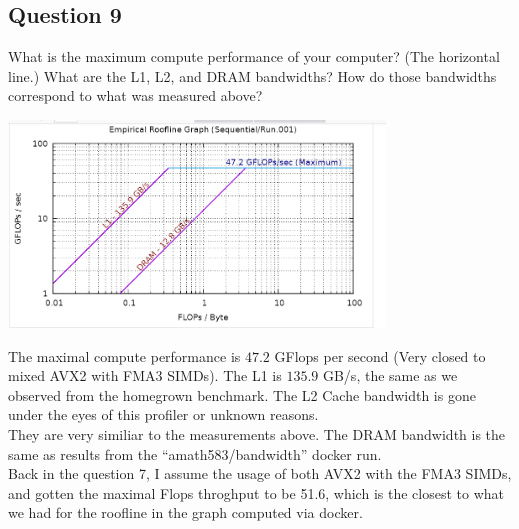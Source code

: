 \documentclass[]{article}
\begin{document}
\subsection*{Question 9}
    What is the maximum compute performance of your computer?  (The horizontal line.)  What are the L1, L2, and DRAM bandwidths?  How do those bandwidths correspond to what was measured above?
    \begin{center}
        \includegraphics[width=10cm]{roofline-graph.png}
    \end{center}
    The maximal compute performance is $47.2$ GFlops per second (Very closed to mixed AVX2 with FMA3 SIMDs). The L1 is $135.9$ GB/s, the same as we observed from the homegrown benchmark. The L2 Cache bandwidth is gone under the eyes of this profiler or unknown reasons. 
    \\
    They are very similiar to the measurements above. The DRAM bandwidth is the same as results from the ``amath583/bandwidth'' docker run. 
    \\
    Back in the question 7, I assume the usage of both AVX2 with the FMA3 SIMDs, and gotten the maximal Flops throghput to be 51.6, which is the closest to what we had for the roofline in the graph computed via docker. 
\end{document}

